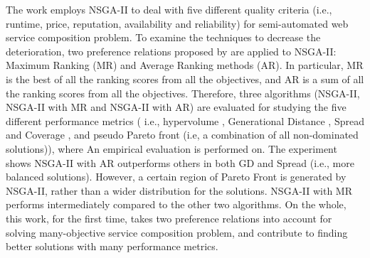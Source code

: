 The work \cite{de2010many} employs NSGA-II to deal with five different quality criteria (i.e., runtime, price, reputation, availability and reliability) for semi-automated web service composition problem.  To examine the techniques to decrease the deterioration, two preference relations proposed by \cite{bentley1997finding} are applied to NSGA-II: Maximum Ranking (MR) and Average Ranking methods (AR). In particular, MR is the best of all the ranking scores from all the objectives, and AR is a sum of all the ranking scores from all the objectives. Therefore, three algorithms (NSGA-II, NSGA-II with MR and NSGA-II with AR) are evaluated for studying the five different performance metrics ( i.e., hypervolume \cite{zitzler1999evolutionary}, Generational Distance \cite{van2000measuring}, Spread and Coverage \cite{zitzler2000comparison}, and pseudo Pareto front (i.e, a combination of all non-dominated solutions)),  where An empirical evaluation is performed on. The experiment shows NSGA-II with AR outperforms others in both GD and Spread (i.e., more balanced solutions). However,  a certain region of  Pareto Front is generated by NSGA-II,  rather than a wider distribution for the solutions. NSGA-II with MR performs intermediately compared to the other two algorithms. On the whole,  this work, for the first time, takes two preference relations into account for solving many-objective service composition problem, and contribute to finding better solutions with many performance metrics.









